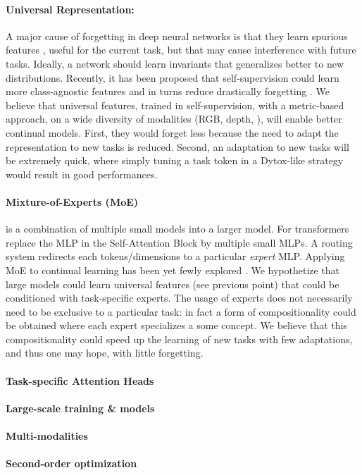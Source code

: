 \paragraph{Universal Representation:} A major cause of forgetting in deep neural networks is that
they learn spurious features \citep{lesort2022spuriousfeatures}, useful for the current task, but
that may cause interference with future tasks. Ideally, a network should learn invariants
\citep{rame2021fishr} that generalizes better to new distributions. Recently, it has been proposed
that self-supervision could learn more class-agnostic features and in turns reduce drastically
forgetting \citep{gallardo2021selfsupcontinual}. We believe that universal features, trained in
self-supervision, with a metric-based approach, on a wide diversity of modalities (RGB, depth,
\etc), will enable better continual models. First, they would forget less because the need to adapt the
representation to new tasks is reduced. Second, an adaptation to new tasks will be extremely quick,
where simply tuning a task token in a Dytox-like strategy would result in good performances.

\paragraph{Mixture-of-Experts (MoE)} is a combination of multiple small models into a larger model. For
transformers replace the MLP in the Self-Attention Block by multiple small MLPs. A routing system
redirects each tokens/dimensions to a particular \textit{expert} MLP. Applying MoE to continual
learning has been yet fewly explored \citep{caccia2022anytimelearning}. We hypothetize that large
models could learn universal features (see previous point) that could be conditioned with
task-specific experts. The usage of experts does not necessarily need to be exclusive to a
particular task: in fact a form of compositionality could be obtained where each expert specializes
a some concept. We believe that this compositionality could speed up the learning of new tasks with
few adaptations, and thus one may hope, with little forgetting.

\paragraph{Task-specific Attention Heads}


\paragraph{Large-scale training \& models} \citep{ramasesh2022scalecontinual}

\paragraph{Multi-modalities}

\paragraph{Second-order optimization}
